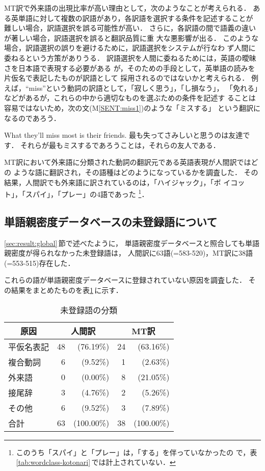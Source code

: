 MT訳で外来語の出現比率が高い理由として，次のようなことが考えられる．
ある英単語に対して複数の訳語があり，各訳語を選択する条件を記述することが
難しい場合，訳語選択を誤る可能性が高い．
さらに，各訳語の間で語義の違いが著しい場合，訳語選択を誤ると翻訳品質に重
大な悪影響が出る．
このような場合，訳語選択の誤りを避けるために，訳語選択をシステムが行なわ
ず人間に委ねるという方策がありうる．
訳語選択を人間に委ねるためには，英語の曖昧さを日本語で表現する必要がある
が，そのための手段として，英単語の読みを片仮名で表記したものが訳語として
採用されるのではないかと考えられる．
例えば，``miss''という動詞の訳語として，「寂しく思う」，「し損なう」，
「免れる」などがあるが，これらの中から適切なものを選ぶための条件を記述す
ることは容易ではないため，次の文(M\ref{SENT:miss1})のような「ミスする」
という翻訳になるのであろう．
\begin{SENT2}
\sentE What they'll miss most is their friends.
\sentH 最も失ってさみしいと思うのは友達です．
\sentM それらが最もミスするであろうことは，それらの友人である．
\label{SENT:miss1}
\end{SENT2}

MT訳において外来語に分類された動詞の翻訳元である英語表現が人間訳ではどの
ような語に翻訳され，その語種はどのようになっているかを調査した．
その結果，人間訳でも外来語に訳されているのは，「ハイジャック」，「ボ
イコット」，「スパイ」，「プレー」の4語であった
\footnote{このうち「スパイ」と「プレー」は，「する」を伴っていなかったの
で，表\ref{tab:wordclass-kotonari}\,では計上されていない．}．

\subsection{単語親密度データベースの未登録語について}
\label{sec:result:undef}

\ref{sec:result:global}\,節で述べたように，
単語親密度データベースと照合しても単語親密度が得られなかった未登録語は，
人間訳に63語(=583-520)，MT訳に38語(=553-515)存在した．

これらの語が単語親密度データベースに登録されていない原因を調査した．
その結果をまとめたものを表\ref{tab:undef}\,に示す．
\begin{table}[htbp]
\caption{未登録語の分類}
\label{tab:undef}
\begin{center}
\begin{tabular}{|l||r@{}r|r@{}r|}\hline
\multicolumn{1}{|c||}{原因} & \multicolumn{2}{c|}{人間訳} & 
\multicolumn{2}{c|}{MT訳} \\\hline\hline
平仮名表記     & 48 &  (76.19\%) & 24 &  (63.16\%) \\
複合動詞       &  6 &   (9.52\%) &  1 &   (2.63\%) \\
外来語         &  0 &   (0.00\%) &  8 &  (21.05\%) \\
接尾辞         &  3 &   (4.76\%) &  2 &   (5.26\%) \\
その他         &  6 &   (9.52\%) &  3 &   (7.89\%) \\\hline
合計           & 63 & (100.00\%) & 38 & (100.00\%) \\\hline
\end{tabular}
\end{center}
\end{table}

